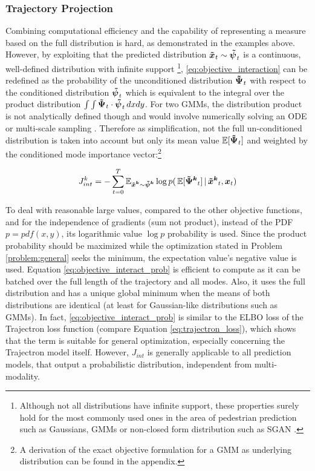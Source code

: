 \subsubsection{Trajectory Projection}
Combining computational efficiency and the capability of representing a measure based on the full distribution is hard, as demonstrated in the examples above. However, by exploiting that the predicted distribution $\xped[]_t \sim \dist[]_t$ is a continuous, well-defined distribution with infinite support \footnote{Although not all distributions have infinite support, these properties surely hold for the most commonly used ones in the area of pedestrian prediction such as Gaussians, \ac{GMM}s \cite{Salzmann2020} or non-closed form distribution such as SGAN \cite{Gupta2018}.}, \ref{eq:objective_interaction} can be redefined as the probability of the unconditioned distribution $\distwo[]_t$ with respect to the conditioned distribution $\dist[]_t$ which is equivalent to the integral over the product distribution $\int \int \distwo[]_t \cdot \dist[]_t \, dxdy$.
\newline
For two \ac{GMM}s, the distribution product is not analytically defined though and would involve numerically solving an \ac{ODE} \cite{Schrempf2005} or multi-scale sampling \cite{Ihler2003}. Therefore as simplification, not the full un-conditioned distribution is taken into account but only its mean value $\mathbb{E}[\distwo[]_t]$ and weighted by the conditioned mode importance vector:\footnote{A derivation of the exact objective formulation for a \ac{GMM} as underlying distribution can be found in the appendix.}

\begin{equation}
J_{int}^k = - \sum_{t=0}^T \mathbb{E}_{\xped[k] \sim \dist[k]} \log p(\, \mathbb{E}[\distwo[k]_t] \, | \, \xped[k]_t, \x_t)
\label{eq:objective_interact_prob}
\end{equation}

To deal with reasonable large values, compared to the other objective functions, and for the independence of gradients (sum not product), instead of the \ac{PDF} $p = pdf(x, y)$, its logarithmic value $\log p$ probability is used. Since the product probability should be maximized while the optimization stated in Problem \ref{problem:general} seeks the minimum, the expectation value's negative value is used.
\newline
Equation \ref{eq:objective_interact_prob} is efficient to compute as it can be batched over the full length of the trajectory and all modes. Also, it uses the full distribution and has a unique global minimum when the means of both distributions are identical (at least for Gaussian-like distributions such as \ac{GMM}s). In fact, \ref{eq:objective_interact_prob} is similar to the \ac{ELBO} loss of the Trajectron loss function (compare Equation \ref{eq:trajectron_loss}), which shows that the term is suitable for general optimization, especially concerning the Trajectron model itself. However, $J_{int}$ is generally applicable to all prediction models, that output a probabilistic distribution, independent from multi-modality.
